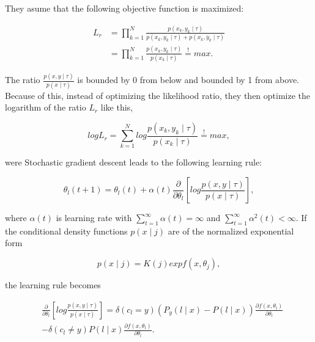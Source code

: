 \documentclass[12pt,oneside,a4paper,parskip]{scrbook}
\begin{document}
They asume that the following objective function is maximized:

\begin{equation}
  \begin{split}
    L_r &= \displaystyle\prod_{k=1}^{N} \frac{p(x_k, y_k\mid\tau)}{p(x_k, y_k\mid\tau) + p(x_k, \bar{y}_k\mid\tau)} \\
        &= \displaystyle\prod_{k=1}^{N} \frac{p(x_k, y_k\mid\tau)}{p(x_k\mid\tau)}  \overset{!}{=} max.
  \end{split}
\end{equation}

The ratio $\frac{p(x, y\mid\tau)}{p(x\mid\tau)}$ is bounded by 0 from below and bounded by 1 from above. Because of this, 
instead of optimizing the likelihood ratio, they then optimize the 
logarithm of the ratio $L_r$ like this,

\begin{equation}
    log L_r = \displaystyle\sum_{k=1}^{N}log\frac{p(x_k, y_k\mid\tau)}{p(x_k\mid\tau)} \overset{!}{=} max,
\end{equation}

were Stochastic gradient descent leads to the following learning rule:

\begin{equation}
  \theta_l(t + 1) = \theta_l(t) + \alpha(t)\frac{\partial}{\partial\theta_l} [log \frac{p(x, y\mid\tau)}{p(x\mid\tau)}]
  \label{equ:RSLVQ_1},
\end{equation}

where $\alpha(t)$ is learning rate with $\sum_{t=1}^{\infty} \alpha(t) = \infty$ and $\sum_{t=1}^{\infty} \alpha^2(t) < \infty$.
If the conditional density functions $p(x\mid j)$ are of the normalized exponential form

\begin{equation}
  p(x\mid j) = K(j) exp f(x, \theta_j), 
\end{equation}

the learning rule becomes

\begin{equation}
  \begin{split}
    &\frac{\partial}{\partial\theta_l} [log \frac{p(x, y\mid\tau)}{p(x\mid\tau)}] = \delta(c_l = y)(P_y(l\mid x) - P(l\mid x))\frac{\partial f(x, \theta_l) }{\partial\theta_l} \\
    &- \delta(c_l \neq y) P(l\mid x)\frac{\partial f(x, \theta_l) }{\partial\theta_l}.
  \end{split}
\end{equation}
\end{document}

